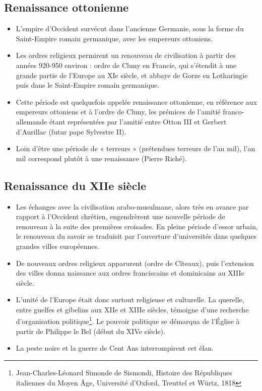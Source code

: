 \documentclass{report}%
\begin{document}
\subsection{Renaissance ottonienne}
	\begin{itemize}
		\item L'empire d'Occident survécut dans l'ancienne Germanie, sous la forme du Saint-Empire romain germanique, avec les empereurs ottoniens.
		\item Les ordres religieux permirent un renouveau de civilisation à partir des années 920-950 environ : ordre de Cluny en Francie, qui s'étendit à une grande partie de l'Europe au XIe siècle, et abbaye de Gorze en Lotharingie puis dans le Saint-Empire romain germanique.
		\item Cette période est quelquefois appelée renaissance ottonienne, en référence aux empereurs ottoniens et à l'ordre de Cluny, les prémices de l'amitié franco-allemande étant représentées par l'amitié entre Otton III et Gerbert d'Aurillac (futur pape Sylvestre II).
		\item Loin d'être une période de « terreurs » (prétendues terreurs de l'an mil), l'an mil correspond plutôt à une renaissance (Pierre Riché).
	\end{itemize}
\subsection{Renaissance du XIIe siècle}
	\begin{itemize}
		\item Les échanges avec la civilisation arabo-musulmane, alors très en avance par rapport à l'Occident chrétien, engendrèrent une nouvelle période de renouveau à la suite des premières croisades. En pleine période d'essor urbain, le renouveau du savoir se traduisit par l'ouverture d'universités dans quelques grandes villes européennes.
		\item De nouveaux ordres religieux apparurent (ordre de Cîteaux), puis l'extension des villes donna naissance aux ordres franciscains et dominicains au XIIIe siècle.
		\item L'unité de l'Europe était donc surtout religieuse et culturelle. La querelle, entre guelfes et gibelins aux XIIe et XIIIe siècles, témoigne d'une recherche d'organisation politique\footnote{Jean-Charles-Léonard Simonde de Sismondi, Histoire des Républiques italiennes du Moyen Âge, Université d'Oxford, Treuttel et Würtz, 1818}. Le pouvoir politique se démarqua de l'Église à partir de Philippe le Bel (début du XIVe siècle).
		\item La peste noire et la guerre de Cent Ans interrompirent cet élan.
	\end{itemize}
\end{document}
